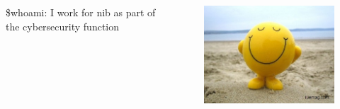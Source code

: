 \documentclass{beamer}
\begin{document}
\begin{frame}
    \begin{columns}
        \begin{column}{0.5\textwidth}
            \$whoami: I work for nib as part of the cybersecurity function
        \end{column}
        \begin{column}{0.5\textwidth}
            \begin{figure}
                \centering
                \includegraphics[width=1\textwidth,keepaspectratio]{../resources/smile.jpg}
            \end{figure}
        \end{column}
    \end{columns}
\end{frame}
\end{document}
